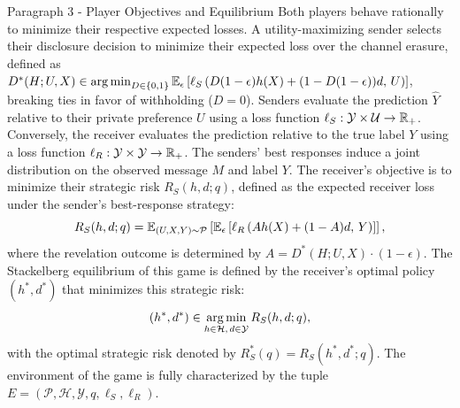 \begin{faqblock}
\faqanswers
{}
\end{faqblock}

\begin{sourceblock}{Paragraph 3 - Player Objectives and Equilibrium}
Both players behave rationally to minimize their respective expected losses. A utility-maximizing sender selects their disclosure decision to minimize their expected loss over the channel erasure, defined as $D^*(H; U, X) \in \operatorname*{arg\,min}_{D \in \{0, 1\}} \mathbb{E}_{\epsilon} \left[ \ell_S\left( D(1-\epsilon)h(X) + (1 - D(1-\epsilon))d, \, U \right) \right]$, breaking ties in favor of withholding ($D = 0$). Senders evaluate the prediction $\hat{Y}$ relative to their private preference $U$ using a loss function $\ell_S: \mathcal{Y} \times \mathcal{U} \to \mathbb{R}_+$. Conversely, the receiver evaluates the prediction relative to the true label $Y$ using a loss function $\ell_R: \mathcal{Y} \times \mathcal{Y} \to \mathbb{R}_+$. The senders' best responses induce a joint distribution on the observed message $M$ and label $Y$. The receiver's objective is to minimize their strategic risk $R_S(h, d; q)$, defined as the expected receiver loss under the sender's best-response strategy:
\begin{equation}
    \label{eq:strategic_risk}
    R_S(h, d; q) = \mathbb{E}_{(U, X, Y) \sim \mathcal{P}} \left[ \mathbb{E}_{\epsilon} \left[ \ell_R\left( A h(X) + (1-A)d, \, Y \right) \right] \right],
\end{equation}
where the revelation outcome is determined by $A = D^*(H; U, X) \cdot (1 - \epsilon)$. The Stackelberg equilibrium of this game is defined by the receiver's optimal policy $(h^*, d^*)$ that minimizes this strategic risk:
\begin{equation}
    \label{eq:stackelberg_opt}
    (h^*, d^*) \in \operatorname*{arg\,min}_{h \in \mathcal{H}, \, d \in \mathcal{Y}} R_S(h, d; q),
\end{equation}
with the optimal strategic risk denoted by $R_S^*(q) = R_S(h^*, d^*; q)$. The environment of the game is fully characterized by the tuple $E = (\mathcal{P}, \mathcal{H}, \mathcal{Y}, q, \ell_S, \ell_R)$.
\end{sourceblock}

